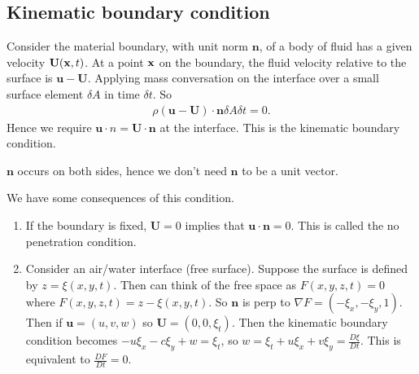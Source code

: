 \documentclass{article}
\begin{document}
\subsection{Kinematic boundary condition}
Consider the material boundary, with unit norm $ \mathbf n $, of a body of fluid has a given velocity $ \mathbf U(\mathbf{x},t) $. At a point $ \mathbf{x} $ on the boundary, the fluid velocity relative to the surface is $ \mathbf u -\mathbf U $. Applying mass conversation on the interface over a small surface element $ \delta A $ in time $ \delta t $. So
\begin{align*}
  \rho(\mathbf u-\mathbf U)\cdot\mathbf n \delta A\delta t = 0.
\end{align*}
Hence we require $ \mathbf u \cdot n = \mathbf U \cdot \mathbf n $ at the interface. This is the kinematic boundary condition.
\begin{remark}
  $ \mathbf n $ occurs on both sides, hence we don't need $ \mathbf n $ to be a unit vector.
\end{remark}
We have some consequences of this condition.
\begin{enumerate}
	\item If the boundary is fixed, $ \mathbf U=0 $ implies that $ \mathbf u \cdot \mathbf n = 0 $. This is called the no penetration condition.
	\item Consider an air/water interface (free surface). Suppose the surface is defined by $ z=\xi(x,y,t) $. Then can think of the free space as $ F(x,y,z,t)=0 $ where $ F(x,y,z,t) = z-\xi(x,y,t) $. So $ \mathbf n $ is perp to $ \nabla F = (-\xi_x,-\xi_y,1) $. Then if $ \mathbf u = (u,v,w) $ so $ \mathbf U = (0,0,\xi_t) $. Then the kinematic boundary condition becomes $ -u\xi_x-c\xi_y+w=\xi_t $, so $ w=\xi_t+u\xi_x+v\xi_y=\frac{D\xi}{Dt} $. This is equivalent to $ \frac{DF}{Dt}=0 $.
\end{enumerate}
\end{document}
